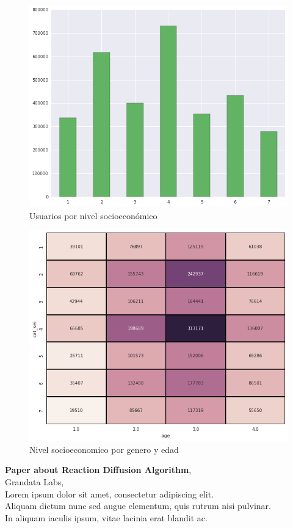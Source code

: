 \documentclass[
10pt,
spanish,
singlespacing, %
parskip, %
headsepline, %
twocolumn
]{article} %
\begin{document}
\begin{figure}
\center
\includegraphics[width=\columnwidth]{Figures/sei_hist}
\caption{Usuarios por nivel socioeconómico}
\end{figure}

\begin{figure}
\center
\includegraphics[width=\columnwidth]{Figures/sei_age_heatmap}
\caption{Nivel socioeconomico por genero y edad}
\end{figure}

\begin{thebibliography}{1}
  \textbf{Paper about Reaction Diffusion Algorithm}, \\
  Grandata Labs, \\
  Lorem ipsum dolor sit amet, consectetur adipiscing elit. \\
  Aliquam dictum nunc sed augue elementum, quis rutrum nisi pulvinar. \\
  In aliquam iaculis ipsum, vitae lacinia erat blandit ac. \\
\end{thebibliography}
\end{document}
